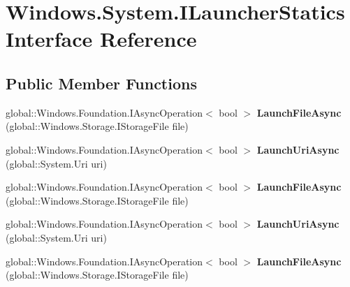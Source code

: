 \hypertarget{interface_windows_1_1_system_1_1_i_launcher_statics}{}\section{Windows.\+System.\+I\+Launcher\+Statics Interface Reference}
\label{interface_windows_1_1_system_1_1_i_launcher_statics}
\subsection*{Public Member Functions}
\begin{DoxyCompactItemize}
\item 
\mbox{\label{interface_windows_1_1_system_1_1_i_launcher_statics_aa8dfdac184d6ee1fc0220fbcdcc541ab}} 
global\+::\+Windows.\+Foundation.\+I\+Async\+Operation$<$ bool $>$ {\bfseries Launch\+File\+Async} (global\+::\+Windows.\+Storage.\+I\+Storage\+File file)
\item 
\mbox{\label{interface_windows_1_1_system_1_1_i_launcher_statics_afacaac47075c49eb66661fc380ca1b73}} 
global\+::\+Windows.\+Foundation.\+I\+Async\+Operation$<$ bool $>$ {\bfseries Launch\+Uri\+Async} (global\+::\+System.\+Uri uri)
\item 
\mbox{\label{interface_windows_1_1_system_1_1_i_launcher_statics_aa8dfdac184d6ee1fc0220fbcdcc541ab}} 
global\+::\+Windows.\+Foundation.\+I\+Async\+Operation$<$ bool $>$ {\bfseries Launch\+File\+Async} (global\+::\+Windows.\+Storage.\+I\+Storage\+File file)
\item 
\mbox{\label{interface_windows_1_1_system_1_1_i_launcher_statics_afacaac47075c49eb66661fc380ca1b73}} 
global\+::\+Windows.\+Foundation.\+I\+Async\+Operation$<$ bool $>$ {\bfseries Launch\+Uri\+Async} (global\+::\+System.\+Uri uri)
\item 
\mbox{\label{interface_windows_1_1_system_1_1_i_launcher_statics_aa8dfdac184d6ee1fc0220fbcdcc541ab}} 
global\+::\+Windows.\+Foundation.\+I\+Async\+Operation$<$ bool $>$ {\bfseries Launch\+File\+Async} (global\+::\+Windows.\+Storage.\+I\+Storage\+File file)

\end{DoxyCompactItemize}
